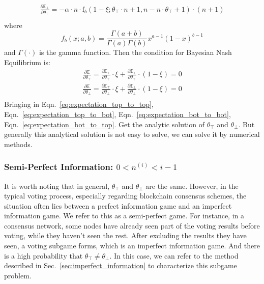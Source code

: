 \documentclass[11pt]{article}
\begin{document}
\begin{equation}
  \label{eq:expectation_bot_to_top}
  \begin{aligned}
  \frac{\partial{\mathbb{E}}_\bot}{\partial{\theta_\top}}= -\alpha\cdot n \cdot  \text{f}_b(1-\xi;\theta_\top\cdot n+1,n-n\cdot\theta_\top+1)\cdot(n+1)\\
  \end{aligned}
\end{equation}
where $$f_b(x;a,b)=\frac{\Gamma(a+b)}{\Gamma(a)\Gamma(b)}x^{a-1}(1-x)^{b-1}$$ and $\Gamma(\cdot)$ is the gamma function.
Then the condition for Bayesian Nash Equilibrium is:
\begin{equation}
  \label{eq:partial_theta}
  \begin{aligned}
    \frac{\partial{\mathbb{E}}}{\partial{\theta_\top}}=\frac{\partial{\mathbb{E}_\top}}{\partial{\theta_\top}}\cdot\xi+\frac{\partial{\mathbb{E}_\bot}}{\partial{\theta_\top}}\cdot(1-\xi)= 0\\
    \frac{\partial{\mathbb{E}}}{\partial{\theta_\bot}}=\frac{\partial{\mathbb{E}_\top}}{\partial{\theta_\bot}}\cdot\xi+\frac{\partial{\mathbb{E}_\bot}}{\partial{\theta_\bot}}\cdot(1-\xi)= 0\\
  \end{aligned}
\end{equation}
Bringing in Eqn.~\ref{eq:expectation_top_to_top}, Eqn.~\ref{eq:expectation_top_to_bot}, Eqn.~\ref{eq:expectation_bot_to_bot}, Eqn.~\ref{eq:expectation_bot_to_top}. Get the analytic solution of $\theta_\top$ and $\theta_\bot$. But generally this analytical solution is not easy to solve, we can solve it by numerical methods.

\subsubsection{Semi-Perfect Information: $0<n^{(i)}<i-1$}
It is worth noting that in general, $\theta_\top$ and $\theta_\bot$ are the same. However, in the typical voting process, especially regarding blockchain consensus schemes, the situation often lies between a perfect information game and an imperfect information game. We refer to this as a semi-perfect game. For instance, in a consensus network, some nodes have already seen part of the voting results before voting, while they haven't seen the rest. After excluding the results they have seen, a voting subgame forms, which is an imperfect information game. And there is a high probability that $\theta_\top \neq \theta_\bot$. In this case, we can refer to the method described in Sec.~\ref{sec:imperfect_information} to characterize this subgame problem.
\end{document}
